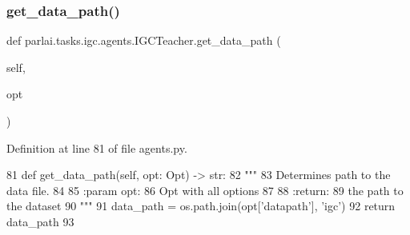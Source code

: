 \mbox{\label{classparlai_1_1tasks_1_1igc_1_1agents_1_1IGCTeacher_a0b521361c618914b791a79dda5e81c41}} 
\subsubsection{\texorpdfstring{get\+\_\+data\+\_\+path()}{get\_data\_path()}}
{\footnotesize\ttfamily def parlai.\+tasks.\+igc.\+agents.\+I\+G\+C\+Teacher.\+get\+\_\+data\+\_\+path (\begin{DoxyParamCaption}\item[{}]{self,  }\item[{}]{opt }\end{DoxyParamCaption})}



Definition at line 81 of file agents.\+py.


\begin{DoxyCode}
81     \textcolor{keyword}{def }get\_data\_path(self, opt: Opt) -> str:
82         \textcolor{stringliteral}{"""}
83 \textcolor{stringliteral}{        Determines path to the data file.}
84 \textcolor{stringliteral}{}
85 \textcolor{stringliteral}{        :param opt:}
86 \textcolor{stringliteral}{            Opt with all options}
87 \textcolor{stringliteral}{}
88 \textcolor{stringliteral}{        :return:}
89 \textcolor{stringliteral}{            the path to the dataset}
90 \textcolor{stringliteral}{        """}
91         data\_path = os.path.join(opt[\textcolor{stringliteral}{'datapath'}], \textcolor{stringliteral}{'igc'})
92         \textcolor{keywordflow}{return} data\_path
93 
\end{DoxyCode}
\mbox{\label{classparlai_1_1tasks_1_1igc_1_1agents_1_1IGCTeacher_a0cbe8d58cdb4a4ad174cd5cdfe16b9e3}} 
